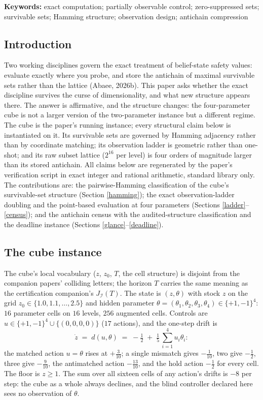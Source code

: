 \documentclass[10pt,twocolumn]{article}
\theoremstyle{plain}
\theoremstyle{definition}
\theoremstyle{remark}
\begin{document}
\textbf{Keywords:} exact computation; partially observable control;
zero-suppressed sets; survivable sets; Hamming structure; observation
design; antichain compression

\subsection{Introduction}\label{introduction}

Two working disciplines govern the exact treatment of belief-state safety values: evaluate exactly where you probe, and store the antichain of maximal survivable sets rather than the lattice (Abaee, 2026b). This paper asks whether the exact discipline survives the curse of dimensionality, and what new structure appears there. The answer is affirmative, and the structure changes: the four-parameter cube is not a larger version of the two-parameter instance but a different regime. The cube is the paper's running instance; every structural claim below is instantiated on it.
Its survivable sets are governed by Hamming adjacency rather than by
coordinate matching; its observation ladder is geometric rather than
one-shot; and its raw subset lattice (\(2^{16}\) per level) is four
orders of magnitude larger than its stored antichain. All claims below
are regenerated by the paper's verification script in exact integer
and rational arithmetic, standard library only. The contributions are:
the pairwise-Hamming classification of the cube's survivable-set
structure (Section \ref{hamming}); the exact observation-ladder
doubling and the point-based evaluation at four parameters (Sections
\ref{ladder}--\ref{census}); and the antichain census with the
audited-structure classification and the deadline instance (Sections
\ref{glance}--\ref{deadline}).

\subsection{The cube instance}\label{instance}

The cube's local vocabulary (\(z\), \(z_{0}\), \(T\), the cell
structure) is disjoint from the companion papers' colliding letters;
the horizon \(T\) carries the same meaning as the certification
companion's \(J_{\mathcal{I}}(T)\). The state is \((z, \theta)\) with stock \(z\) on the grid
\(z_{0} \in \{1.0, 1.1, \dots, 2.5\}\) and hidden parameter
\(\theta = (\theta_{1}, \theta_{2}, \theta_{3}, \theta_{4}) \in
\{+1, -1\}^{4}\): \(16\) parameter cells on \(16\) levels, \(256\)
augmented cells. Controls are \(u \in \{+1,-1\}^{4} \cup \{(0,0,0,0)\}\)
(\(17\) actions), and the one-step drift is
\[
\dot z \;=\; d(u, \theta) \;=\; -\tfrac12
\;+\; \tfrac15\,\textstyle\sum_{i=1}^{4} u_{i}\theta_{i}:
\]
the matched action \(u = \theta\) rises at \(+\tfrac3{10}\); a single
mismatch gives \(-\tfrac1{10}\), two give \(-\tfrac12\), three give
\(-\tfrac9{10}\), the antimatched action \(-\tfrac{13}{10}\), and the
hold action \(-\tfrac12\) for every cell. The floor is \(z \ge 1\).
The sum over all sixteen cells of any action's drifts is \(-8\) per
step: the cube as a whole always declines, and the blind controller
declared here sees no observation of \(\theta\).
\end{document}

